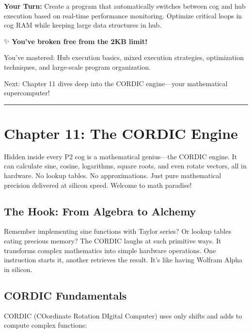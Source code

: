\documentclass[11pt]{book}
\begin{document}
\textbf{Your Turn:} Create a program that automatically switches between
cog and hub execution based on real-time performance monitoring.
Optimize critical loops in cog RAM while keeping large data structures
in hub.

\begin{chapterend}
✨ \textbf{You've broken free from the 2KB limit!}

You've mastered: Hub execution basics, mixed execution strategies, optimization techniques, and large-scale program organization.

Next: Chapter 11 dives deep into the CORDIC engine—your mathematical supercomputer!
\end{chapterend}

\begin{center}\rule{0.5\linewidth}{0.5pt}\end{center}

\hypertarget{chapter-11-the-cordic-engine}{%
\section{Chapter 11: The CORDIC
Engine}\label{chapter-11-the-cordic-engine}}

Hidden inside every P2 cog is a mathematical genius---the CORDIC engine.
It can calculate sine, cosine, logarithms, square roots, and even rotate
vectors, all in hardware. No lookup tables. No approximations. Just pure
mathematical precision delivered at silicon speed. Welcome to math
paradise!

\hypertarget{the-hook-from-algebra-to-alchemy}{%
\subsection{The Hook: From Algebra to
Alchemy}\label{the-hook-from-algebra-to-alchemy}}

Remember implementing sine functions with Taylor series? Or lookup
tables eating precious memory? The CORDIC laughs at such primitive ways.
It transforms complex mathematics into simple hardware operations. One
instruction starts it, another retrieves the result. It's like having
Wolfram Alpha in silicon.

\hypertarget{cordic-fundamentals}{%
\subsection{CORDIC Fundamentals}\label{cordic-fundamentals}}

CORDIC (COordinate Rotation DIgital Computer) uses only shifts and adds
to compute complex functions:
\end{document}
